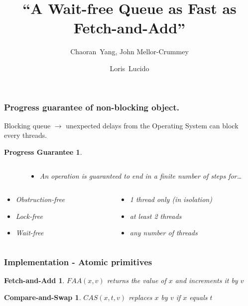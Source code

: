 \documentclass[10pt,a4paper]{beamer}
\title{``A Wait-free Queue as Fast as Fetch-and-Add'' }
\subtitle{Chaoran~Yang, John Mellor-Crummey}
\author[L. Lucido]{Loris~Lucido\\[-.25em]}
\institute[IR]{Lecture d'articles - Soutenance}
\date{\displaydate{date}}
\begin{document}
\begin{frame}
  \vspace{3.5em}
  \titlepage
\end{frame}


\begin{frame}
  \frametitle{Progress guarantee of non-blocking object.}
  Blocking queue $\rightarrow$ unexpected delays from the Operating System
  can block every threads. \center \vfill
  \newtheorem{progress}[theorem]{Progress Guarantee}
  \begin{progress}
    \center
    \begin{columns}
      \begin{column}{0.3\textwidth}
      \end{column}
      \begin{column}{0.7\textwidth}
        \begin{itemize}
        \item[] An operation is guaranteed to end in a finite number of steps for\ldots
        \end{itemize}
      \end{column}
    \end{columns}
    \medskip
    \begin{columns}
      \begin{column}{0.3\textwidth}
        \begin{itemize}
        \item Obstruction-free
        \item Lock-free
        \item Wait-free
        \end{itemize}
      \end{column}
      \begin{column}{0.7\textwidth}
        \begin{itemize}
        \item[] 1 thread only (in isolation)
        \item[] at least 2 threads
        \item[] any number of threads
        \end{itemize}
      \end{column}
    \end{columns}
  \end{progress}
\end{frame}

\begin{frame}
  \frametitle{Implementation - Atomic primitives}
  \newtheorem{faa}[theorem]{Fetch-and-Add}
  \newtheorem{cas}[theorem]{Compare-and-Swap}
  \begin{faa}
    $FAA(x, v)$ returns the value of $x$ and increments it by $v$
  \end{faa}
  \vfill
  \begin{cas}
    $CAS(x,t,v)$ replaces $x$ by $v$ if $x$ equals $t$
  \end{cas}
\end{frame}
\end{document}
